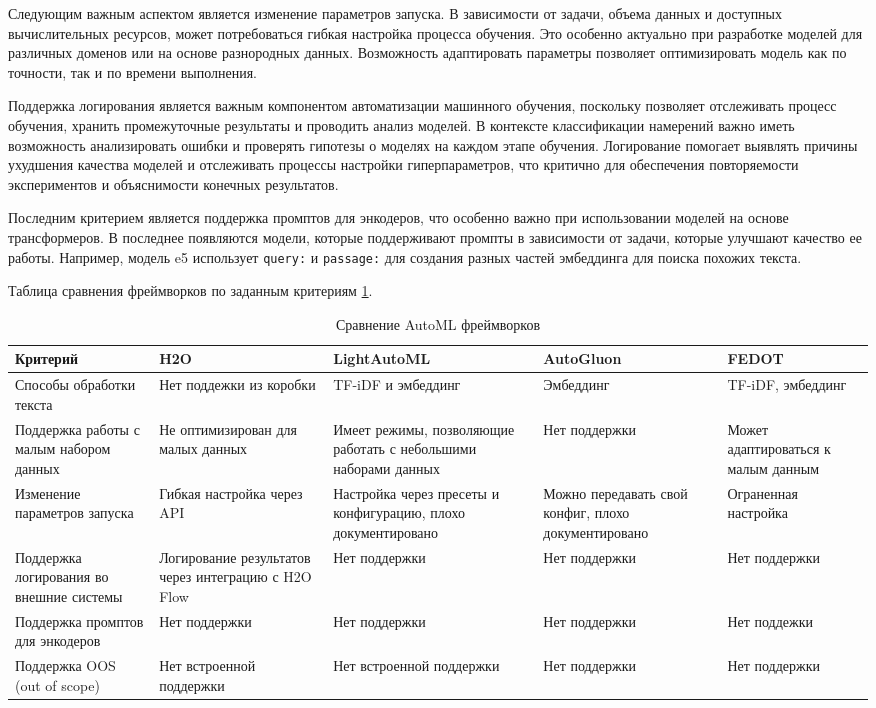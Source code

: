 \documentclass[14pt,a4paper,oneside,openany]{extbook}
\begin{document}
Следующим важным аспектом является изменение параметров запуска. В зависимости от задачи, объема данных и доступных вычислительных ресурсов, может потребоваться гибкая настройка процесса обучения. Это особенно актуально при разработке моделей для различных доменов или на основе разнородных данных. Возможность адаптировать параметры позволяет оптимизировать модель как по точности, так и по времени выполнения.

Поддержка логирования является важным компонентом автоматизации машинного обучения, поскольку позволяет отслеживать процесс обучения, хранить промежуточные результаты и проводить анализ моделей. В контексте классификации намерений важно иметь возможность анализировать ошибки и проверять гипотезы о моделях на каждом этапе обучения. Логирование помогает выявлять причины ухудшения качества моделей и отслеживать процессы настройки гиперпараметров, что критично для обеспечения повторяемости экспериментов и объяснимости конечных результатов.

Последним критерием является поддержка промптов для энкодеров, что особенно важно при использовании моделей на основе трансформеров. В последнее появляются модели, которые поддерживают промпты в зависимости от задачи, которые улучшают качество ее работы. Например, модель e5\autocite{wang_multilingual_2024} использует \texttt{query:} и \texttt{passage:} для создания разных частей эмбеддинга для поиска похожих текста.

Таблица сравнения фреймворков по заданным критериям \ref{tbl:automl_comparison}.

\begin{table}[h!]
\caption{\label{tbl:automl_comparison}Сравнение AutoML фреймворков}
\centering
\begin{tabular}{|p{3cm}|p{3cm}|p{3cm}|p{3cm}|p{3cm}|}
\hline
Критерий & H2O & LightAutoML & AutoGluon & FEDOT\\
\hline
Способы обработки текста & Нет поддежки из коробки & TF-iDF\autocite{joneskarensparck_statistical_1972} и эмбеддинг & Эмбеддинг & TF-iDF, эмбеддинг\\
\hline
Поддержка работы с малым набором данных & Не оптимизирован для малых данных & Имеет режимы, позволяющие работать с небольшими наборами данных & Нет поддержки & Может адаптироваться к малым данным\\
\hline
Изменение параметров запуска & Гибкая настройка через API & Настройка через пресеты и конфигурацию, плохо документировано & Можно передавать свой конфиг, плохо документировано & Ограненная настройка\\
\hline
Поддержка логирования во внешние системы & Логирование результатов через интеграцию с H2O Flow & Нет поддержки & Нет поддержки & Нет поддержки\\
\hline
Поддержка промптов для энкодеров & Нет поддержки & Нет поддержки & Нет поддержки & Нет поддежки\\
\hline
Поддержка OOS (out of scope) & Нет встроенной поддержки & Нет встроенной поддержки & Нет поддержки & Нет поддержки\\
\hline
\end{tabular}
\end{table}
\end{document}
